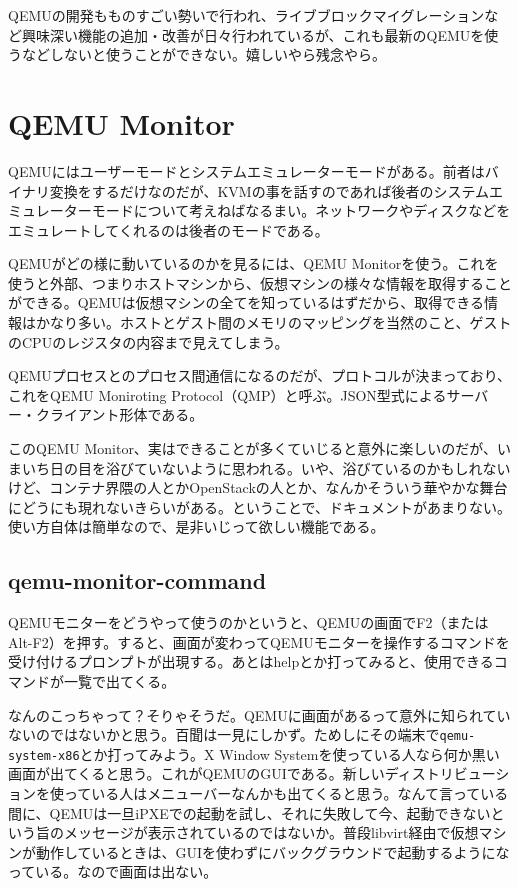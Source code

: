 ﻿\documentclass[9pt,b5paper,tombo,openany]{jsbook}
\begin{document}
QEMUの開発もものすごい勢いで行われ、ライブブロックマイグレーションなど興味深い機能の追加・改善が日々行われているが、これも最新のQEMUを使うなどしないと使うことができない。嬉しいやら残念やら。

\section{QEMU Monitor}

QEMUにはユーザーモードとシステムエミュレーターモードがある。前者はバイナリ変換をするだけなのだが、KVMの事を話すのであれば後者のシステムエミュレーターモードについて考えねばなるまい。ネットワークやディスクなどをエミュレートしてくれるのは後者のモードである。

QEMUがどの様に動いているのかを見るには、QEMU Monitorを使う。これを使うと外部、つまりホストマシンから、仮想マシンの様々な情報を取得することができる。QEMUは仮想マシンの全てを知っているはずだから、取得できる情報はかなり多い。ホストとゲスト間のメモリのマッピングを当然のこと、ゲストのCPUのレジスタの内容まで見えてしまう。

QEMUプロセスとのプロセス間通信になるのだが、プロトコルが決まっており、これをQEMU Moniroting Protocol（QMP）と呼ぶ。JSON型式によるサーバー・クライアント形体である。

このQEMU Monitor、実はできることが多くていじると意外に楽しいのだが、いまいち日の目を浴びていないように思われる。いや、浴びているのかもしれないけど、コンテナ界隈の人とかOpenStackの人とか、なんかそういう華やかな舞台にどうにも現れないきらいがある。ということで、ドキュメントがあまりない。使い方自体は簡単なので、是非いじって欲しい機能である。

\subsection{qemu-monitor-command}

QEMUモニターをどうやって使うのかというと、QEMUの画面でF2（またはAlt-F2）を押す。すると、画面が変わってQEMUモニターを操作するコマンドを受け付けるプロンプトが出現する。あとはhelpとか打ってみると、使用できるコマンドが一覧で出てくる。

なんのこっちゃって？そりゃそうだ。QEMUに画面があるって意外に知られていないのではないかと思う。百聞は一見にしかず。ためしにその端末で\verb|qemu-system-x86|とか打ってみよう。X Window Systemを使っている人なら何か黒い画面が出てくると思う。これがQEMUのGUIである。新しいディストリビューションを使っている人はメニューバーなんかも出てくると思う。なんて言っている間に、QEMUは一旦iPXEでの起動を試し、それに失敗して今、起動できないという旨のメッセージが表示されているのではないか。普段libvirt経由で仮想マシンが動作しているときは、GUIを使わずにバックグラウンドで起動するようになっている。なので画面は出ない。
\end{document}

